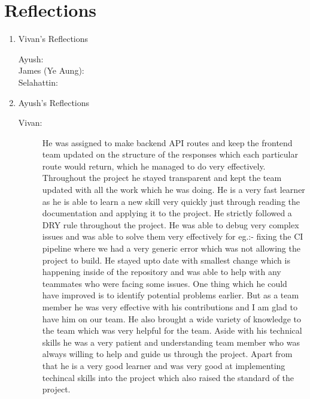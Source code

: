 \documentclass[a4paper, 12pt]{article}
\begin{document}
\section*{Reflections}
\begin{enumerate}
    \item Vivan's Reflections
        \begin{description}
            \item[Ayush: ] %
            \item[James (Ye Aung): ] %
            \item[Selahattin: ] %
        \end{description}
    \item Ayush's Reflections
        \begin{description}
            \item[Vivan: ] He was assigned to make backend API routes and keep the frontend team updated on the structure of the responses which each particular route would return, which he managed to do very effectively. Throughout the project he stayed transparent and kept the team updated with all the work which he was doing. He is a very fast learner as he is able to learn a new skill very quickly just through reading the documentation and applying it to the project. He strictly followed a DRY rule throughout the project. He was able to debug very complex issues and was able to solve them very effectively for eg.:- fixing the CI pipeline where we had a very generic error which was not allowing the project to build. He stayed upto date with smallest change which is happening inside of the repository and was able to help with any teammates who were facing some issues. One thing which he could have improved is to identify potential problems earlier. But as a team member he was very effective with his contributions and I am glad to have him on our team. He also brought a wide variety of knowledge to the team which was very helpful for the team. Aside with his technical skills he was a very patient and understanding team member who was always willing to help and guide us through the project. Apart from that he is a very good learner and was very good at implementing techincal skills into the project which also raised the standard of the project.

\end{description}
\end{enumerate}
\end{document}
